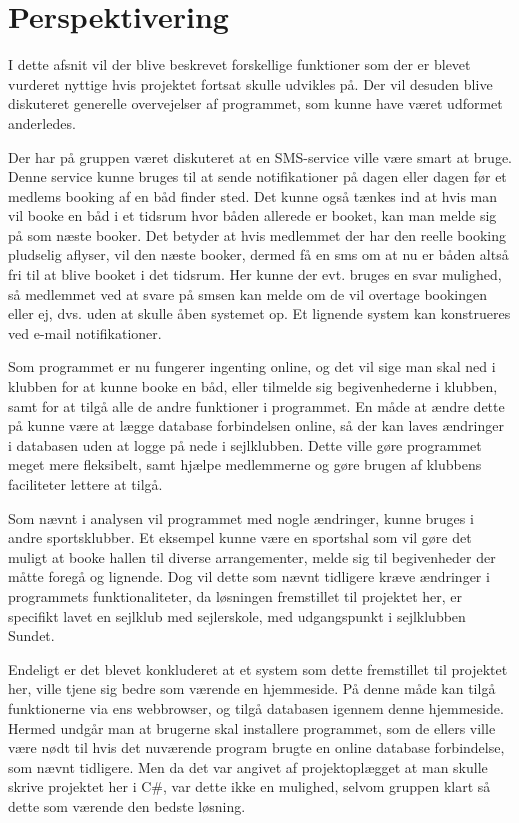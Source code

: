 \chapter{Perspektivering}

\cbstart

I dette afsnit vil der blive beskrevet forskellige funktioner som der er blevet vurderet nyttige hvis projektet fortsat
skulle udvikles på. Der vil desuden blive diskuteret generelle overvejelser af programmet, som kunne have været udformet
anderledes. 

Der har på gruppen været diskuteret at en SMS-service ville være smart at bruge. Denne service kunne bruges til at sende
notifikationer på dagen eller dagen før et medlems booking af en båd finder sted. Det kunne også tænkes ind at hvis man
vil booke en båd i et tidsrum hvor båden allerede er booket, kan man melde sig på som næste booker. Det betyder at hvis
medlemmet der har den reelle booking pludselig aflyser, vil den næste booker, dermed få en sms om at nu er båden altså
fri til at blive booket i det tidsrum. Her kunne der evt. bruges en svar mulighed, så medlemmet ved at svare på smsen
kan melde om de vil overtage bookingen eller ej, dvs. uden at skulle åben systemet op. Et lignende system kan
konstrueres ved e-mail notifikationer.

Som programmet er nu fungerer ingenting online, og det vil sige man skal ned i klubben for at kunne booke en båd, eller
tilmelde sig begivenhederne i klubben, samt for at tilgå alle de andre funktioner i programmet. En måde at ændre dette på kunne være
at lægge database forbindelsen online, så der kan laves ændringer i databasen uden at logge på nede i sejlklubben. Dette
ville gøre programmet meget mere fleksibelt, samt hjælpe medlemmerne og gøre brugen af klubbens faciliteter lettere at
tilgå.

Som nævnt i analysen vil programmet med nogle ændringer, kunne bruges i andre sportsklubber. Et eksempel kunne være en
sportshal som vil gøre det muligt at booke hallen til diverse arrangementer, melde sig til begivenheder der måtte foregå
og lignende. Dog vil dette som nævnt tidligere kræve ændringer i programmets funktionaliteter, da løsningen fremstillet
til projektet her, er specifikt lavet en sejlklub med sejlerskole, med udgangspunkt i sejlklubben Sundet.

Endeligt er det blevet konkluderet at et system som dette fremstillet til projektet her, ville tjene sig bedre som
værende en hjemmeside. På denne måde kan tilgå funktionerne via ens webbrowser, og tilgå databasen igennem denne
hjemmeside. Hermed undgår man at brugerne skal installere programmet, som de ellers ville være nødt til hvis det
nuværende program brugte en online database forbindelse, som nævnt tidligere. Men da det var angivet af projektoplægget
at man skulle skrive projektet her i C\#, var dette ikke en mulighed, selvom gruppen klart så dette som værende den
bedste løsning.

\cbend